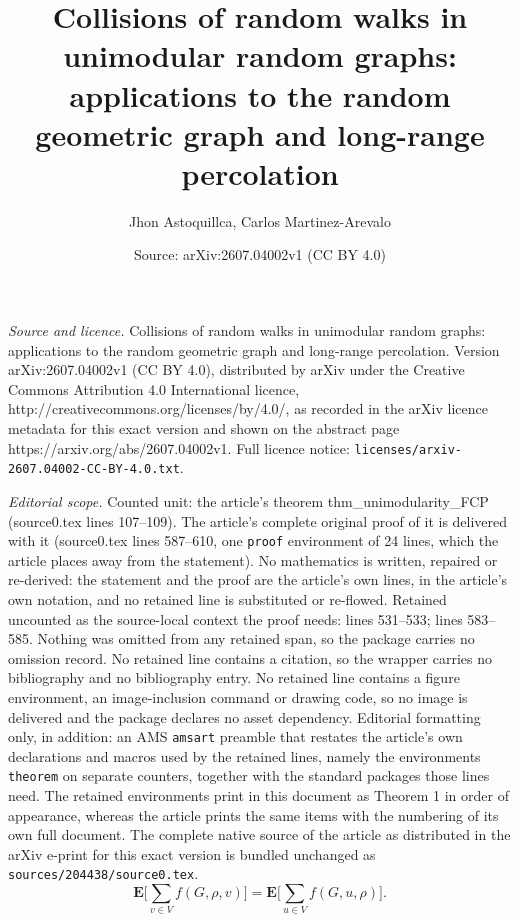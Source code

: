 \documentclass[10pt,a4paper]{amsart}
\title{Collisions of random walks in unimodular random graphs: applications to the random geometric graph and long-range percolation}
\author{Jhon Astoquillca, Carlos Martinez-Arevalo}
\date{Source: arXiv:2607.04002v1 (CC BY 4.0)}
\begin{document}
\maketitle

\noindent\emph{Source and licence.} Collisions of random walks in unimodular random graphs: applications to the random geometric graph and long-range percolation. Version arXiv:2607.04002v1 (CC BY 4.0), distributed by arXiv under the Creative Commons Attribution 4.0 International licence, http://creativecommons.org/licenses/by/4.0/, as recorded in the arXiv licence metadata for this exact version and shown on the abstract page https://arxiv.org/abs/2607.04002v1. Full licence notice: \texttt{licenses/arxiv-2607.04002-CC-BY-4.0.txt}.\par\smallskip

\noindent\textit{Editorial scope.} Counted unit: the article's theorem thm\_unimodularity\_FCP (source0.tex lines 107--109). The article's complete original proof of it is delivered with it (source0.tex lines 587--610, one \texttt{proof} environment of 24 lines, which the article places away from the statement). No mathematics is written, repaired or re-derived: the statement and the proof are the article's own lines, in the article's own notation, and no retained line is substituted or re-flowed.  Retained uncounted as the source-local context the proof needs: lines 531--533; lines 583--585.  Nothing was omitted from any retained span, so the package carries no omission record.  No retained line contains a citation, so the wrapper carries no bibliography and no bibliography entry.  No retained line contains a figure environment, an image-inclusion command or drawing code, so no image is delivered and the package declares no asset dependency.  Editorial formatting only, in addition: an AMS \texttt{amsart} preamble that restates the article's own declarations and macros used by the retained lines, namely the environments \texttt{theorem} on separate counters, together with the standard packages those lines need.  The retained environments print in this document as Theorem 1 in order of appearance, whereas the article prints the same items with the numbering of its own full document.  The complete native source of the article as distributed in the arXiv e-print for this exact version is bundled unchanged as \texttt{sources/204438/source0.tex}.
\begin{equation}\label{Mass_Transport_Principle}
    \mathbf E \Big[\sum_{v \in V} f(G,\rho,v) \Big] = \mathbf E \Big[\sum_{u \in V} f(G,u,\rho) \Big].
\end{equation}
\end{document}
